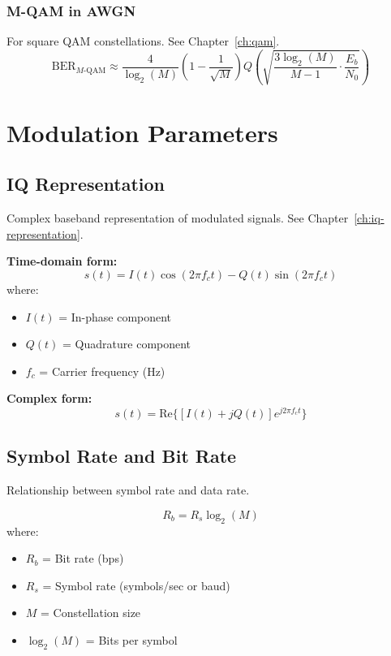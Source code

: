 \subsubsection{M-QAM in AWGN}
For square QAM constellations. See Chapter~\ref{ch:qam}.
\begin{equation}
\text{BER}_{M\text{-QAM}} \approx \frac{4}{\log_2(M)}\left(1 - \frac{1}{\sqrt{M}}\right) Q\left(\sqrt{\frac{3\log_2(M)}{M-1} \cdot \frac{E_b}{N_0}}\right)
\label{eq:ber-mqam}
\end{equation}

\section{Modulation Parameters}
\label{sec:modulation}

\subsection{IQ Representation}
\label{sec:iq-representation}

Complex baseband representation of modulated signals. See Chapter~\ref{ch:iq-representation}.

\textbf{Time-domain form:}
\begin{equation}
s(t) = I(t)\cos(2\pi f_c t) - Q(t)\sin(2\pi f_c t)
\label{eq:iq-time}
\end{equation}
where:
\begin{itemize}
\item $I(t)$ = In-phase component
\item $Q(t)$ = Quadrature component
\item $f_c$ = Carrier frequency (Hz)
\end{itemize}

\textbf{Complex form:}
\begin{equation}
s(t) = \text{Re}\{[I(t) + jQ(t)]e^{j2\pi f_c t}\}
\label{eq:iq-complex}
\end{equation}

\subsection{Symbol Rate and Bit Rate}
\label{sec:symbol-rate}

Relationship between symbol rate and data rate.

\begin{equation}
R_b = R_s \log_2(M)
\label{eq:bit-symbol-rate}
\end{equation}
where:
\begin{itemize}
\item $R_b$ = Bit rate (bps)
\item $R_s$ = Symbol rate (symbols/sec or baud)
\item $M$ = Constellation size
\item $\log_2(M)$ = Bits per symbol
\end{itemize}

